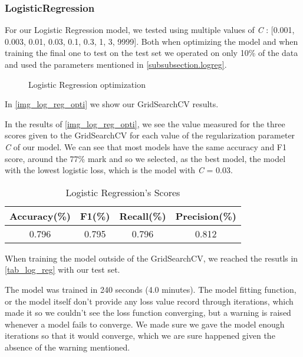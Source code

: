 \documentclass[12pt]{article}
\begin{document}
\subsubsection{LogisticRegression}
\label{subsubsection.logreg_tunning}
    \par 
        For our Logistic Regression model, we tested using multiple values of \textit{C} : [0.001, 0.003, 0.01, 0.03, 0.1, 0.3, 1, 3, 9999].
        Both when optimizing the model and when training the final one to test on the test set we operated on only 10\% of the data and 
        used the parameters mentioned in \autoref{subsubsection.logreg}.
    \begin{figure}[!htb]
        \caption{Logistic Regression optimization}
        \label{img_log_reg_opti}
    \end{figure}
        In \autoref{img_log_reg_opti} we show our GridSearchCV results.
    \par 
        In the results of \autoref{img_log_reg_opti}, we see the value measured for the three scores given to the GridSearchCV for each value of 
        the regularization parameter \textit{C} of our model. We can see that most models have the same accuracy and F1 score, around the 77\% mark 
        and so we selected, as the best model, the model with the lowest logistic loss, which is the model with \textit{C} = 0.03.
    \begin{center}
        \begin{table}[!h]
            \caption{Logistic Regression's Scores}
            \begin{center}
            \begin{tabular}{|c |c |c |c|}
                \hline
                Accuracy(\%) & F1(\%) & Recall(\%) & Precision(\%) \\ [0.5ex] 
                \hline
                0.796 & 0.795 & 0.796 & 0.812 \\ 
                \hline
            \end{tabular}
            \label{tab_log_reg}
        \end{center}
        \end{table}
    \end{center}
    \par 
        When training the model outside of the GridSearchCV, we reached the resutls in \autoref{tab_log_reg} with our test set.
    \par 
        The model was trained in 240 seconds (4.0 minutes).
        The model fitting function, or the model itself don't provide any loss value record through iterations, which made it so we couldn't see the 
        loss function converging, but a warning is raised whenever a model fails to converge. We made sure we gave the model enough iterations so that 
        it would converge, which we are sure happened given the absence of the warning mentioned.
\end{document}
